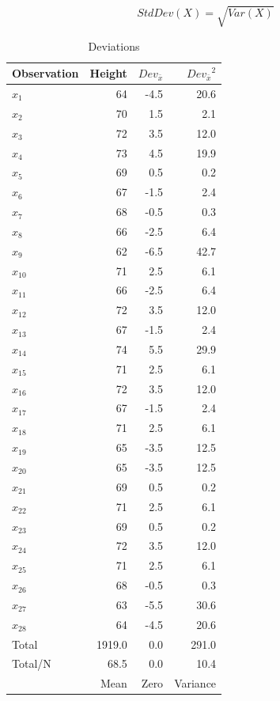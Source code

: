 \documentclass[nohyper,justified]{tufte-handout}\usepackage[]{graphicx}\usepackage[]{color}
\newcommand{\dev}[1] {Dev_{\bar{#1}}}
\begin{document}
\begin{equation*}
StdDev(X)=\sqrt{Var(X)} 
\end{equation*}

\begin{table}[ht]
\centering
\begin{tabular}{lrrr}
  \toprule
Observation & Height & $\dev{x}$ & ${\dev{x}}^2$ \\ 
  \midrule
$x_{1}$ & 64 & -4.5 & 20.6 \\ 
   \rowcolor[gray]{0.95}$x_{2}$ & 70 & 1.5 & 2.1 \\ 
  $x_{3}$ & 72 & 3.5 & 12.0 \\ 
   \rowcolor[gray]{0.95}$x_{4}$ & 73 & 4.5 & 19.9 \\ 
  $x_{5}$ & 69 & 0.5 & 0.2 \\ 
   \rowcolor[gray]{0.95}$x_{6}$ & 67 & -1.5 & 2.4 \\ 
  $x_{7}$ & 68 & -0.5 & 0.3 \\ 
   \rowcolor[gray]{0.95}$x_{8}$ & 66 & -2.5 & 6.4 \\ 
  $x_{9}$ & 62 & -6.5 & 42.7 \\ 
   \rowcolor[gray]{0.95}$x_{10}$ & 71 & 2.5 & 6.1 \\ 
  $x_{11}$ & 66 & -2.5 & 6.4 \\ 
   \rowcolor[gray]{0.95}$x_{12}$ & 72 & 3.5 & 12.0 \\ 
  $x_{13}$ & 67 & -1.5 & 2.4 \\ 
   \rowcolor[gray]{0.95}$x_{14}$ & 74 & 5.5 & 29.9 \\ 
  $x_{15}$ & 71 & 2.5 & 6.1 \\ 
   \rowcolor[gray]{0.95}$x_{16}$ & 72 & 3.5 & 12.0 \\ 
  $x_{17}$ & 67 & -1.5 & 2.4 \\ 
   \rowcolor[gray]{0.95}$x_{18}$ & 71 & 2.5 & 6.1 \\ 
  $x_{19}$ & 65 & -3.5 & 12.5 \\ 
   \rowcolor[gray]{0.95}$x_{20}$ & 65 & -3.5 & 12.5 \\ 
  $x_{21}$ & 69 & 0.5 & 0.2 \\ 
   \rowcolor[gray]{0.95}$x_{22}$ & 71 & 2.5 & 6.1 \\ 
  $x_{23}$ & 69 & 0.5 & 0.2 \\ 
   \rowcolor[gray]{0.95}$x_{24}$ & 72 & 3.5 & 12.0 \\ 
  $x_{25}$ & 71 & 2.5 & 6.1 \\ 
   \rowcolor[gray]{0.95}$x_{26}$ & 68 & -0.5 & 0.3 \\ 
  $x_{27}$ & 63 & -5.5 & 30.6 \\ 
   \rowcolor[gray]{0.95}$x_{28}$ & 64 & -4.5 & 20.6 \\ 
   \bottomrule
Total & 1919.0 &  0.0 & 291.0 \\ 
\rowcolor[gray]{0.95}Total/N & 68.5 &  0.0 & 10.4 \\ 
 & Mean & Zero & Variance \\
\end{tabular}
\caption{Deviations} 
\end{table}
\end{document}
